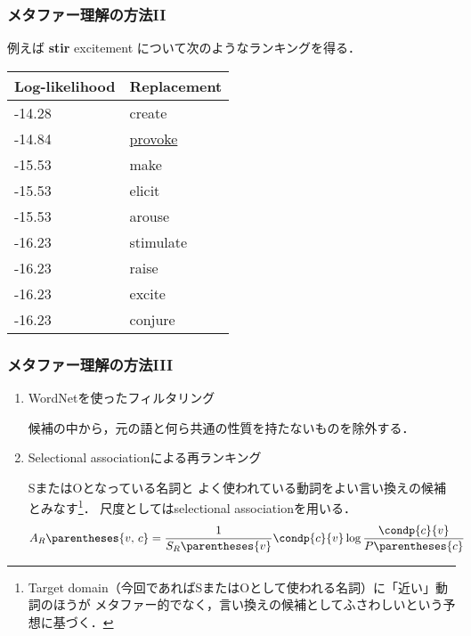 \documentclass[11pt]{beamer}
\newlength{\la}
\newcommand\metaphorical[1]{\textcolor{sRed}{\textbf{#1}}}
\newcommand\thc[1]{\multicolumn{1}{c}{\textbf{#1}}}
\begin{document}
\begin{frame}
\frametitle{メタファー理解の方法II}
    例えば \metaphorical{stir} excitement について次のようなランキングを得る．

    \begingroup
    \scriptsize
    \begin{center}
        \begin{tabular}{ll}
            \toprule
            \thc{Log-likelihood} &
                \thc{Replacement} \\
            \midrule
            -14.28 & create \\
            -14.84 & \underline{provoke} \\
            -15.53 & make \\
            -15.53 & elicit \\
            -15.53 & arouse \\
            -16.23 & stimulate \\
            -16.23 & raise \\
            -16.23 & excite \\
            -16.23 & conjure \\
            \bottomrule
        \end{tabular}
    \end{center}
    \endgroup
\end{frame}

\begin{frame}
\frametitle{メタファー理解の方法III}
\setlength{\leftmargini}{0em}
\begin{enumerate}
\addtocounter{enumi}{2}
    \item WordNetを使ったフィルタリング

        候補の中から，元の語と何ら共通の性質を持たないものを除外する．

    \item\label{selectionalassociation} Selectional associationによる再ランキング

        SまたはOとなっている名詞と
        よく使われている動詞をよい言い換えの候補とみなす\footnote{%
            Target domain（今回であればSまたはOとして使われる名詞）に「近い」動詞のほうが
            メタファー的でなく，言い換えの候補としてふさわしいという予想に基づく．
        }．
        尺度としてはselectional associationを用いる．
        \begin{align*}
            A_R\parentheses{v,\, c}
            &= \frac{1}{S_R\parentheses{v}}
            \condp{c}{v}\log \frac{\condp{c}{v}}{P\parentheses{c}}
        \end{align*}
\end{enumerate}
\end{frame}
\end{document}
